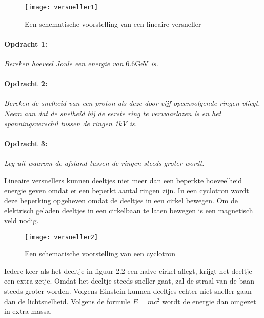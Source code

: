 \begin{figure}[h]
\noindent \begin{centering}
\texttt{[image: versneller1]}
\par\end{centering}

\caption{Een schematische voorstelling van een lineaire versneller}
\end{figure}


\paragraph*{Opdracht 1:}

\emph{Bereken hoeveel Joule een energie van }6.6GeV\emph{ is.}


\paragraph*{Opdracht 2:}

\emph{Bereken de snelheid van een proton als deze door vijf opeenvolgende
ringen vliegt. Neem aan dat de snelheid bij de eerste ring te verwaarlozen
is en het spanningsverschil tussen de ringen 1kV is.}


\paragraph*{Opdracht 3:}

\emph{Leg uit waarom de afstand tussen de ringen steeds groter wordt.}

Lineaire versnellers kunnen deeltjes niet meer dan een beperkte hoeveelheid
energie geven omdat er een beperkt aantal ringen zijn. In een cyclotron
wordt deze beperking opgeheven omdat de deeltjes in een cirkel bewegen.
Om de elektrisch geladen deeltjes in een cirkelbaan te laten bewegen
is een magnetisch veld nodig.

\begin{figure}[h]
\noindent \begin{centering}
\texttt{[image: versneller2]}
\par\end{centering}

\caption{Een schematische voorstelling van een cyclotron}
\end{figure}


Iedere keer als het deeltje in figuur 2.2 een halve cirkel aflegt,
krijgt het deeltje een extra zetje. Omdat het deeltje steeds sneller
gaat, zal de straal van de baan steeds groter worden. Volgens Einstein
kunnen deeltjes echter niet sneller gaan dan de lichtsnelheid. Volgens
de formule $E=mc^{2}$ wordt de energie dan omgezet in extra massa.


